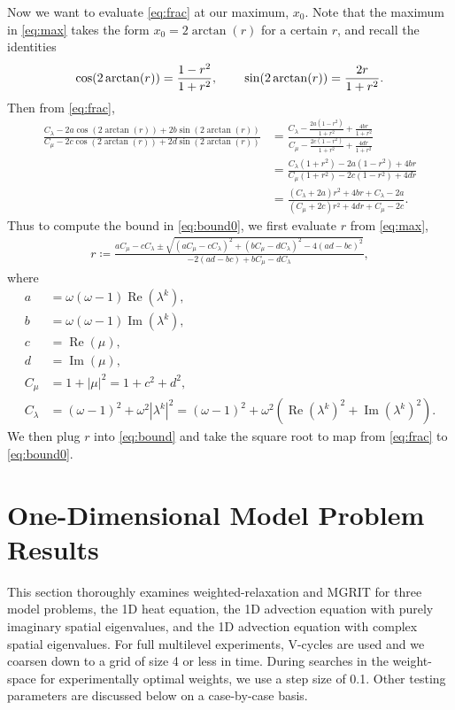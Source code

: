 \documentclass[VANCOUVER,STIX1COL]{WileyNJD-v2}
\newcommand{\Rea}{\operatorname{Re}}
\newcommand{\Ima}{\operatorname{Im}}
\begin{document}
Now we want to evaluate \eqref{eq:frac} at our maximum, $x_0$. Note
that the maximum in \eqref{eq:max} takes the form $x_0 = 2\arctan(r)$ for
a certain $r$, and recall the identities
%
\begin{align*}
\cos(2\arctan(r)) = \frac{1-r^2}{1+r^2}, \hspace{5ex}
\sin(2\arctan(r)) = \frac{2r}{1+r^2}.
\end{align*}
%
Then from \eqref{eq:frac},
%
\begin{align}\nonumber
\frac{C_\lambda - 2a\cos(2\arctan(r)) + 2b\sin(2\arctan(r))}
	{C_\mu - 2c\cos(2\arctan(r)) + 2d\sin(2\arctan(r))}
& = \frac{C_\lambda - \frac{2a(1-r^2)}{1+r^2} + \frac{4br}{1+r^2}}
	{C_\mu - \frac{2c(1-r^2)}{1+r^2} + \frac{4dr}{1+r^2}} \nonumber\\
& = \frac{C_\lambda(1+r^2) - 2a(1-r^2) + 4br}
	{C_\mu(1+r^2) - 2c(1-r^2) + 4dr} \nonumber\\
& = \frac{(C_\lambda + 2a)r^2 + 4br + C_\lambda - 2a}
	{(C_\mu + 2c)r^2 + 4dr + C_\mu - 2c}.\label{eq:bound}
\end{align}
%
Thus to compute the bound in \eqref{eq:bound0}, we first evaluate 
$r$ from \eqref{eq:max},
%
\begin{align}\label{eq:r}
r \coloneqq \frac{a C_\mu - c C_\lambda \pm \sqrt{(aC_\mu - cC_\lambda)^2 + 
	(bC_\mu - dC_\lambda)^2 - 4(ad-bc)^2}}{-2(a d - b c) + b C_\mu - dC_\lambda},
\end{align}
%
where 
%
\begin{align*}
a & = \omega(\omega-1)\Rea(\lambda^k), \\
b & = \omega(\omega-1)\Ima(\lambda^k), \\
c & = \Rea(\mu), \\
d & = \Ima(\mu), \\
C_\mu & = 1 + |\mu|^2 = 1 + c^2+d^2, \\
C_\lambda & = (\omega-1)^2 + \omega^2|\lambda^k|^2 = (\omega-1)^2 +
	\omega^2(\Rea(\lambda^k)^2 + \Ima(\lambda^k)^2).
\end{align*}
%
We then plug $r$ into \eqref{eq:bound} and take the square root to
map from \eqref{eq:frac} to \eqref{eq:bound0}.


\section{One-Dimensional Model Problem Results} \label{app2}
This section thoroughly examines weighted-relaxation and MGRIT for three model problems, the 1D heat equation, the 1D advection equation with purely imaginary spatial eigenvalues, and the 1D advection equation with complex spatial eigenvalues.
For full multilevel experiments, V-cycles are used and we coarsen down to a grid of size 4 or less in time.  During searches in the weight-space for experimentally optimal weights, we use a step size of 0.1.  Other testing parameters are discussed below on a case-by-case basis.
\end{document}
